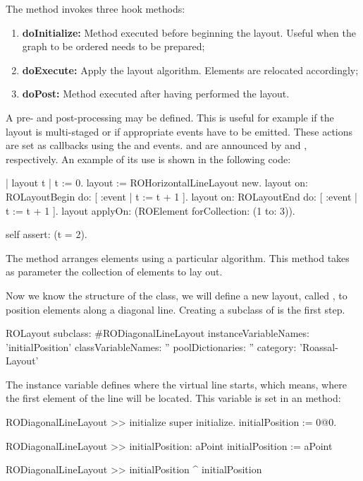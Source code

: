 \documentclass[a4paper,10pt,twoside]{book}
\begin{document}
The  method invokes three hook methods:

\begin{enumerate}
\item \textbf{doInitialize:} Method executed before beginning the layout. Useful when the graph to be ordered needs to be prepared;
\item \textbf{doExecute:} Apply the layout algorithm. Elements are relocated accordingly;
\item \textbf{doPost:} Method executed after having performed the layout. 
\end{enumerate}

A pre- and post-processing may be defined. This is useful for example if the layout is multi-staged or if appropriate events have to be emitted. These actions are set as callbacks using the  and  events.
 and  are announced by  and , respectively. An example of its use is shown in the following code:

\begin{code}{}
| layout t |
t := 0.
layout := ROHorizontalLineLayout new.
layout on: ROLayoutBegin do: [ :event | t := t + 1 ].
layout on: ROLayoutEnd do: [ :event | t := t + 1 ].
layout applyOn: (ROElement forCollection: (1 to: 3)).

self assert: (t = 2).
\end{code}

The  method arranges elements using a particular algorithm. This method takes as parameter the collection of elements to lay out.

Now we know the structure of the  class, we will define a new layout, called , to position elements along a diagonal line.
Creating a subclass of  is the first step. 

\begin{code}{}
ROLayout subclass: #RODiagonalLineLayout
	instanceVariableNames: 'initialPosition'
	classVariableNames: ''
	poolDictionaries: ''
	category: 'Roassal-Layout'
\end{code}

The instance variable  defines where the virtual line starts, which means, where the first element of the line will be located. This variable is set in an  method:

\begin{code}{}
RODiagonalLineLayout >> initialize
	super initialize.
	initialPosition := 0@0.
	
RODiagonalLineLayout >> initialPosition: aPoint
	initialPosition := aPoint
	
RODiagonalLineLayout >> initialPosition
	^ initialPosition
\end{code}
\end{document}
